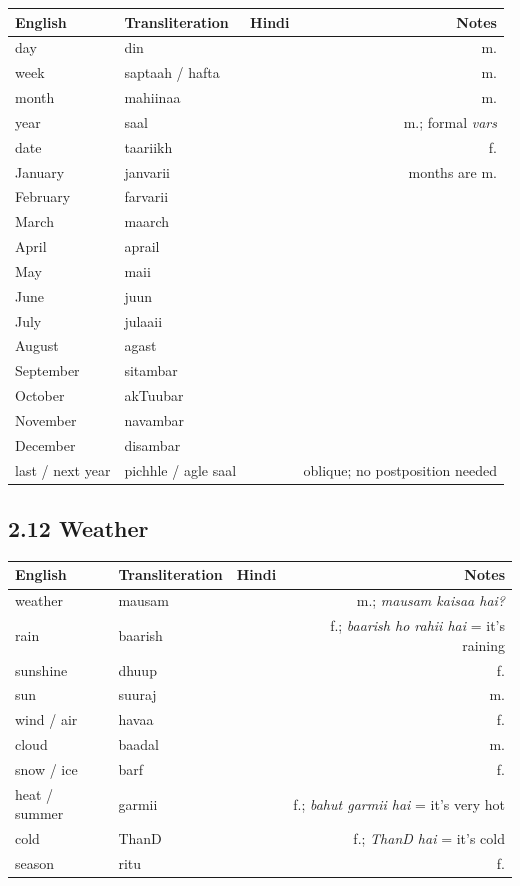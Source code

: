 \begin{tabular}{@{}VTDN@{}}
  \toprule
  English & Transliteration & Hindi & Notes \\
  \midrule
  day & din &  & m. \\
  week & saptaah / hafta &  & m. \\
  month & mahiinaa &  & m. \\
  year & saal &  & m.; formal \textit{vars} \\
  date & taariikh &  & f. \\
  January & janvarii &  & months are m. \\
  February & farvarii &  &  \\
  March & maarch &  &  \\
  April & aprail &  &  \\
  May & maii &  &  \\
  June & juun &  &  \\
  July & julaaii &  &  \\
  August & agast &  &  \\
  September & sitambar &  &  \\
  October & akTuubar &  &  \\
  November & navambar &  &  \\
  December & disambar &  &  \\
  last / next year & pichhle / agle saal &  & oblique; no postposition needed \\
  \bottomrule
\end{tabular}

\subsection{2.12 Weather}

\begin{tabular}{@{}VTDN@{}}
  \toprule
  English & Transliteration & Hindi & Notes \\
  \midrule
  weather & mausam &  & m.; \textit{mausam kaisaa hai?} \\
  rain & baarish &  & f.; \textit{baarish ho rahii hai} = it's raining \\
  sunshine & dhuup &  & f. \\
  sun & suuraj &  & m. \\
  wind / air & havaa &  & f. \\
  cloud & baadal &  & m. \\
  snow / ice & barf &  & f. \\
  heat / summer & garmii &  & f.; \textit{bahut garmii hai} = it's very hot \\
  cold & ThanD &  & f.; \textit{ThanD hai} = it's cold \\
  season & ritu &  & f. \\
  \bottomrule
\end{tabular}

